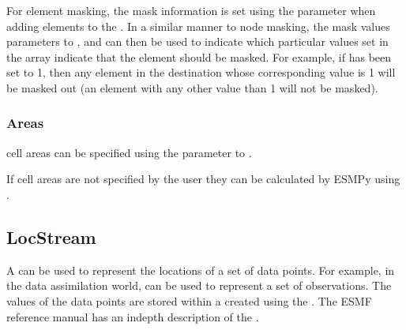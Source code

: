 \documentclass[letterpaper,10pt,english]{sphinxmanual}
\begin{document}
For element masking, the mask information is set using the 
parameter when adding elements to the {\hyperref[\detokenize{mesh:ESMF.api.mesh.Mesh}]{}}. In a similar manner to node masking,
the mask values parameters to {\hyperref[\detokenize{regrid:ESMF.api.regrid.Regrid}]{}},  and 
can then be used to indicate which particular values set in the 
array indicate that the element should be masked. For example, if
 has been set to 1, then any element in the destination {\hyperref[\detokenize{mesh:ESMF.api.mesh.Mesh}]{}}
whose corresponding  value is 1 will be masked out (an element
with any other value than 1 will not be masked).


\subsubsection{Areas}
\label{\detokenize{api:areas}}
{\hyperref[\detokenize{mesh:ESMF.api.mesh.Mesh}]{}} cell areas can be specified using the  parameter to
{\hyperref[\detokenize{mesh:ESMF.api.mesh.Mesh.add_elements}]{}}.

If cell areas are not specified by the user they can be calculated by ESMPy
using {\hyperref[\detokenize{field:ESMF.api.field.Field.get_area}]{}}.


\subsection{LocStream}
\label{\detokenize{api:locstream}}
A {\hyperref[\detokenize{locstream:ESMF.api.locstream.LocStream}]{}} can be used to represent the locations of a set of
data points. For example, in the data assimilation world, {\hyperref[\detokenize{locstream:ESMF.api.locstream.LocStream}]{}} can be used
to represent a set of observations. The values of the data points are stored
within a {\hyperref[\detokenize{field:ESMF.api.field.Field}]{}} created using the {\hyperref[\detokenize{locstream:ESMF.api.locstream.LocStream}]{}}. The ESMF reference
manual has an in\sphinxhyphen{}depth description of the
.
\end{document}
